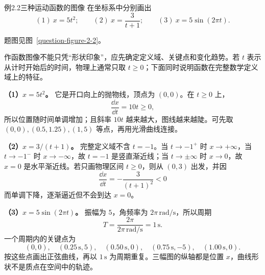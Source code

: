 \begin{origexamplebox}{例2.2\quad 三种运动函数的图像}
在坐标系中分别画出
\[
  (1)\ x=5t^2;\qquad (2)\ x=\frac{3}{t+1};\qquad
  (3)\ x=5\sin(2\pi t).
\]
\par 题图见图~\ref{question-figure-2-2}。
\KQuestionAC
\end{origexamplebox}
\begin{xesolution}
作函数图像不能只凭“形状印象”，应先确定定义域、关键点和变化趋势。若 $t$ 表示从计时开始后的时间，物理上通常只取 $t\ge0$；下面同时说明函数在完整数学定义域上的特征。

\textbf{（1）$x=5t^2$。}
它是开口向上的抛物线，顶点为 $(0,0)$。在 $t\ge0$ 上，
\[
 \frac{\dd x}{\dd t}=10t\ge0,
\]
所以位置随时间单调增加；且斜率 $10t$ 越来越大，图线越来越陡。可先取
$(0,0),(0.5,1.25),(1,5)$ 等点，再用光滑曲线连接。

\textbf{（2）$x=3/(t+1)$。}
完整定义域不含 $t=-1$。当 $t\to-1^+$ 时 $x\to+\infty$，当
$t\to-1^-$ 时 $x\to-\infty$，故 $t=-1$ 是竖直渐近线；当
$t\to\pm\infty$ 时 $x\to0$，故 $x=0$ 是水平渐近线。若只画物理区间
$t\ge0$，则从 $(0,3)$ 出发，并因
\[
 \frac{\dd x}{\dd t}=-\frac{3}{(t+1)^2}<0
\]
而单调下降，逐渐逼近但不会到达 $x=0$。

\textbf{（3）$x=5\sin(2\pi t)$。}
振幅为 $5$，角频率为 $2\pi\,\mathrm{rad/s}$，所以周期
\[
 T=\frac{2\pi}{2\pi\,\mathrm{rad/s}}=1\,\mathrm s.
\]
一个周期内的关键点为
\[
 (0,0),\quad (0.25\,\mathrm s,5),\quad (0.50\,\mathrm s,0),
 \quad (0.75\,\mathrm s,-5),\quad (1.00\,\mathrm s,0).
\]
按这些点画出正弦曲线，再以 $1\,\mathrm s$ 为周期重复。三幅图的纵轴都是位置 $x$，曲线形状不是质点在空间中的轨迹。
\begin{center}\end{center}
\end{xesolution}

